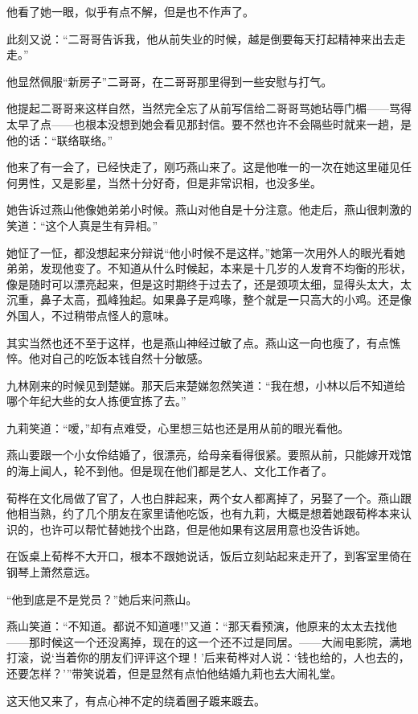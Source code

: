 \par 他看了她一眼，似乎有点不解，但是也不作声了。
\par 此刻又说：“二哥哥告诉我，他从前失业的时候，越是倒要每天打起精神来出去走走。”
\par 他显然佩服“新房子”二哥哥，在二哥哥那里得到一些安慰与打气。
\par 他提起二哥哥来这样自然，当然完全忘了从前写信给二哥哥骂她玷辱门楣——骂得太早了点——也根本没想到她会看见那封信。要不然也许不会隔些时就来一趟，是他的话：“联络联络。”
\par 他来了有一会了，已经快走了，刚巧燕山来了。这是他唯一的一次在她这里碰见任何男性，又是影星，当然十分好奇，但是非常识相，也没多坐。
\par 她告诉过燕山他像她弟弟小时候。燕山对他自是十分注意。他走后，燕山很刺激的笑道：“这个人真是生有异相。”
\par 她怔了一怔，都没想起来分辩说“他小时候不是这样。”她第一次用外人的眼光看她弟弟，发现他变了。不知道从什么时候起，本来是十几岁的人发育不均衡的形状，像是随时可以漂亮起来，但是这时期终于过去了，还是颈项太细，显得头太大，太沉重，鼻子太高，孤峰独起。如果鼻子是鸡喙，整个就是一只高大的小鸡。还是像外国人，不过稍带点怪人的意味。
\par 其实当然也还不至于这样，也是燕山神经过敏了点。燕山这一向也瘦了，有点憔悴。他对自己的吃饭本钱自然十分敏感。
\par 九林刚来的时候见到楚娣。那天后来楚娣忽然笑道：“我在想，小林以后不知道给哪个年纪大些的女人拣便宜拣了去。”
\par 九莉笑道：“嗳，”却有点难受，心里想三姑也还是用从前的眼光看他。
\par 燕山要跟一个小女伶结婚了，很漂亮，给母亲看得很紧。要照从前，只能嫁开戏馆的海上闻人，轮不到他。但是现在他们都是艺人、文化工作者了。
\par 荀桦在文化局做了官了，人也白胖起来，两个女人都离掉了，另娶了一个。燕山跟他相当熟，约了几个朋友在家里请他吃饭，也有九莉，大概是想着她跟荀桦本来认识的，也许可以帮忙替她找个出路，但是他如果有这层用意也没告诉她。
\par 在饭桌上荀桦不大开口，根本不跟她说话，饭后立刻站起来走开了，到客室里倚在钢琴上萧然意远。
\par “他到底是不是党员？”她后来问燕山。
\par 燕山笑道：“不知道。都说不知道嚜!”又道：“那天看预演，他原来的太太去找他——那时候这一个还没离掉，现在的这一个还不过是同居。——大闹电影院，满地打滚，说‘当着你的朋友们评评这个理！’后来荀桦对人说：‘钱也给的，人也去的，还要怎样？'”带笑说着，但是显然有点怕他结婚九莉也去大闹礼堂。
\par 这天他又来了，有点心神不定的绕着圈子踱来踱去。
